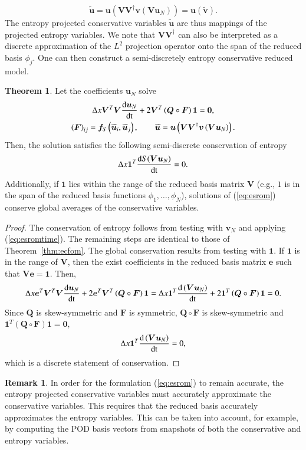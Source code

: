 \documentclass[preprint,10pt]{elsarticle}
\theoremstyle{definition}
\theoremstyle{lemma}
\newtheorem*{remark}{Remark}
\theoremstyle{theorem}
\newtheorem{theorem}{Theorem}
\theoremstyle{assumption}
\renewcommand{\tilde}{\widetilde}
\newcommand{\td}[2]{\frac{{\rm d}#1}{{\rm d}{\rm #2}}}
\newcommand{\LRp}[1]{\left( #1 \right)}
\begin{document}
\[
\tilde{\bm{u}} = \bm{u}\LRp{\bm{V}\bm{V}^{\dagger}\bm{v}\LRp{\bm{V}\bm{u}_N}} = \bm{u}\LRp{\tilde{\bm{v}}}.
\]
The entropy projected conservative variables $\tilde{\bm{u}}$ are thus mappings of the projected entropy variables.  We note that $\bm{V}\bm{V}^{\dagger}$ can also be interpreted as a discrete approximation of the $L^2$ projection operator onto the span of the reduced basis $\phi_j$.  One can then construct a semi-discretely entropy conservative reduced model.  
\begin{theorem} 
Let the coefficients $\bm{u}_N$ solve
\begin{gather}
\Delta x\bm{V}^T\bm{V}\td{\bm{u}_N}{t} + 2\bm{V}^T\LRp{\bm{Q}\circ \bm{F}}\bm{1} = \bm{0}, \label{eq:esrom}\\
\LRp{\bm{F}}_{ij} = \bm{f}_S\LRp{\tilde{\bm{u}}_i,\tilde{\bm{u}}_j}, \qquad \tilde{\bm{u}} = \bm{u}\LRp{\bm{V}\bm{V}^{\dagger}\bm{v}\LRp{\bm{V}\bm{u}_N}}.\nonumber
\end{gather}
Then, the solution satisfies the following semi-discrete conservation of entropy
\[
\Delta x\bm{1}^T\td{S(\bm{V}\bm{u}_N)}{t} = 0.
\]
Additionally, if $\bm{1}$ lies within the range of the reduced basis matrix $\bm{V}$ (e.g., $1$ is in the span of the reduced basis functions $\phi_1, \ldots, \phi_N$), solutions of (\ref{eq:esrom}) conserve global averages of the conservative variables.
\label{thm:esrom}
\end{theorem}
\begin{proof}
The conservation of entropy follows from testing with $\bm{v}_N$ and applying (\ref{eq:esromtime}).  The remaining steps are identical to those of Theorem~\ref{thm:ecfom}.  The global conservation results from testing with $\bm{1}$.  If $\bm{1}$ is in the range of $\bm{V}$, then the exist coefficients in the reduced basis matrix $\bm{e}$ such that $\bm{V}\bm{e}=\bm{1}$.  Then, 
\begin{align*}
\Delta x\bm{e}^T\bm{V}^T\bm{V}\td{\bm{u}_N}{t} + 2\bm{e}^T\bm{V}^T\LRp{\bm{Q}\circ \bm{F}}\bm{1}  = \Delta x\bm{1}^T\td{\LRp{\bm{V}\bm{u}_N}}{t} + 2\bm{1}^T\LRp{\bm{Q}\circ \bm{F}}\bm{1} = 0.
\end{align*}
Since $\bm{Q}$ is skew-symmetric and $\bm{F}$ is symmetric, $\bm{Q} \circ \bm{F}$ is skew-symmetric and $\bm{1}^T\LRp{\bm{Q}\circ \bm{F}}\bm{1} = \bm{0}$, 
\[
\Delta x\bm{1}^T\td{\LRp{\bm{V}\bm{u}_N}}{t} = 0,
\]
which is a discrete statement of conservation.
\end{proof}

\begin{remark}
In order for the formulation (\ref{eq:esrom}) to remain accurate, the entropy projected conservative variables must accurately approximate the conservative variables.  This requires that the reduced basis accurately approximates the entropy variables.  This can be taken into account, for example, by computing the POD basis vectors from snapshots of both the conservative and entropy variables.
\end{remark}
\end{document}
